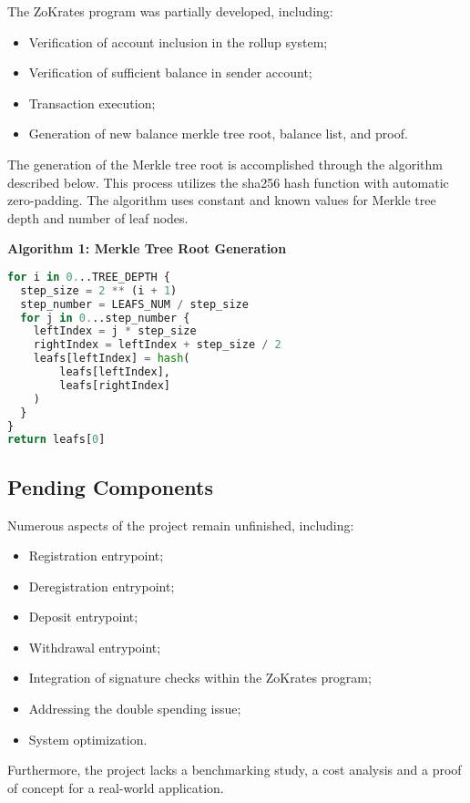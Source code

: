 The ZoKrates program was partially developed, including:
\begin{itemize}
    \item Verification of account inclusion in the rollup system;
    \item Verification of sufficient balance in sender account;
    \item Transaction execution;
    \item Generation of new balance merkle tree root, balance list, and proof.
\end{itemize}

The generation of the Merkle tree root is accomplished through the algorithm described below. This process utilizes the sha256 hash function with automatic zero-padding. The algorithm uses constant and known values for Merkle tree depth and number of leaf nodes.

\noindent\textbf{Algorithm 1: Merkle Tree Root Generation}
\begin{lstlisting}[language=Python]
for i in 0...TREE_DEPTH {
  step_size = 2 ** (i + 1)
  step_number = LEAFS_NUM / step_size
  for j in 0...step_number {
    leftIndex = j * step_size
    rightIndex = leftIndex + step_size / 2
    leafs[leftIndex] = hash(
        leafs[leftIndex],
        leafs[rightIndex]
    )
  }
}
return leafs[0]
\end{lstlisting}

\subsection{Pending Components\label{subsec:pendingcomponents}}
Numerous aspects of the project remain unfinished, including:
\begin{itemize}
  \vspace{-0.11in}
  \item Registration entrypoint;\vspace{-0.11in}
  \item Deregistration entrypoint;\vspace{-0.11in}
  \item Deposit entrypoint;\vspace{-0.11in}
  \item Withdrawal entrypoint;\vspace{-0.11in}
  \item Integration of signature checks within the ZoKrates program;\vspace{-0.11in}
  \item Addressing the double spending issue;\vspace{-0.11in}
  \item System optimization.\vspace{-0.11in}
\end{itemize}
Furthermore, the project lacks a benchmarking study, a cost analysis and a proof of concept for a real-world application.

